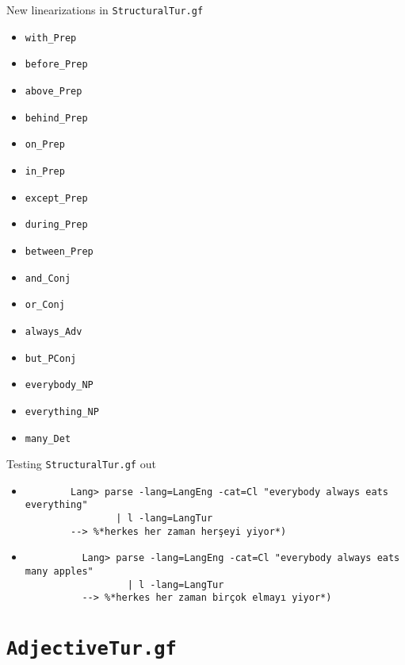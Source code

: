 \documentclass{beamer}
\begin{document}
  \begin{frame}{New linearizations in \texttt{StructuralTur.gf}}
    \scriptsize
    \begin{itemize}
      \item \texttt{with\_Prep}
      \item \texttt{before\_Prep}
      \item \texttt{above\_Prep}
      \item \texttt{behind\_Prep}
      \item \texttt{on\_Prep}
      \item \texttt{in\_Prep}
      \item \texttt{except\_Prep}
      \item \texttt{during\_Prep}
      \item \texttt{between\_Prep}
      \item \texttt{and\_Conj}
      \item \texttt{or\_Conj}
      \item \texttt{always\_Adv}
      \item \texttt{but\_PConj}
      \item \texttt{everybody\_NP}
      \item \texttt{everything\_NP}
      \item \texttt{many\_Det}
    \end{itemize}
    \normalsize
  \end{frame}

  \begin{frame}[fragile]{Testing \texttt{StructuralTur.gf} out}
    \begin{itemize}
      \item<1->
        \begin{lstlisting}
        Lang> parse -lang=LangEng -cat=Cl "everybody always eats everything"
                | l -lang=LangTur
        --> %*herkes her zaman herşeyi yiyor*)
        \end{lstlisting}
      \item<3->
        \begin{lstlisting}
          Lang> parse -lang=LangEng -cat=Cl "everybody always eats many apples"
                  | l -lang=LangTur
          --> %*herkes her zaman birçok elmayı yiyor*)
        \end{lstlisting}
    \end{itemize}
  \end{frame}

  \section{\texttt{AdjectiveTur.gf}}
\end{document}
